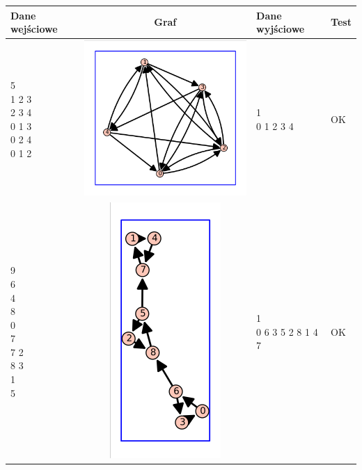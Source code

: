 \documentclass[a4paper,10pt]{article}
\begin{document}
\begin{center}
\begin{tabular}{|l|c|l|l|}\hline
{\bf Dane wejściowe}&{\bf Graf}&{\bf Dane wyjściowe}&{\bf Test}\\ \hline
\shortstack[l]{
5\\
1 2 3\\
2 3 4\\
0 1 3\\
0 2 4\\
0 1 2
}
&\includegraphics[width=5 cm]{sample_data2}&
\shortstack[l]{
1\\
0 1 2 3 4 
}
&OK\\ \hline

\shortstack[l]{
9\\
6\\
4\\
8\\
0\\
7\\
7 2\\
8 3\\
1\\
5
}
&\includegraphics[height=6 cm]{sample_data3}&
\shortstack[l]{
1\\
0 6 3 5 2 8 1 4 7 
}
&OK\\ \hline


\end{tabular}
\end{center}
\end{document}
